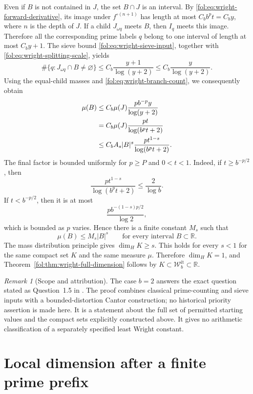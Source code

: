 \documentclass[11pt,a4paper]{article}
\theoremstyle{definition}
\theoremstyle{remark}
\newtheorem{remark}[theorem]{Remark}
\numberwithin{equation}{section}
\begin{document}
Even if $B$ is not contained in $J$, the set $B\cap J$ is an interval. By \eqref{fol:eq:wright-forward-derivative}, its image under
$f^{\circ(n+1)}$ has length at most $C_b b^pt=C_b y$, where $n$ is
the depth of $J$. If a child $J_{\omega q}$ meets $B$, then $I_q$ meets this image. Therefore all the corresponding prime labels $q$
belong to one interval of length at most $C_b y+1$. The sieve bound
\eqref{fol:eq:wright-sieve-input}, together with
\eqref{fol:eq:wright-splitting-scale}, yields
\[
 \#\{q:J_{\omega q}\cap B\ne\varnothing\}
 \le C_b\frac{y+1}{\log(y+2)}
 \le C_b\frac{y}{\log(y+2)}.
\]
Using the equal-child masses and
\eqref{fol:eq:wright-branch-count}, we consequently obtain
\begin{align}
 \mu(B)
 &\le C_b\mu(J)\frac{p b^{-p}y}{\log(y+2)}\notag\\
 &=C_b\mu(J)\frac{pt}{\log(b^pt+2)}\notag\\
 &\le C_b A_s |B|^s
       \frac{p t^{1-s}}{\log(b^pt+2)}.
 \label{fol:eq:wright-general-interval}
\end{align}
The final factor is bounded uniformly for $p\ge P$ and $0<t<1$. Indeed, if $t\ge b^{-p/2}$, then
\[
 \frac{p t^{1-s}}{\log(b^pt+2)}\le\frac2{\log b}.
\]
If $t<b^{-p/2}$, then it is at most
\[
 \frac{p b^{-(1-s)p/2}}{\log2},
\]
which is bounded as $p$ varies. Hence there is a finite constant $M_s$ such that
\[
 \mu(B)\le M_s|B|^s
 \qquad\text{for every interval }B\subset\mathbb R.
\]
The mass distribution principle gives $\dim_HK\ge s$. This holds for every $s<1$ for the same compact set $K$ and the same measure $\mu$.
Therefore $\dim_HK=1$, and Theorem~\ref{fol:thm:wright-full-dimension} follows by $K\subset\mathcal W_b^{\mathrm{it}}\subset\mathbb R$.
\begin{remark}[Scope and attribution]
The case $b=2$ answers the exact question stated as Question~1.5 in
\cite[arXiv version]{SaitoDimension2021}. The proof combines classical
prime-counting and sieve inputs with a bounded-distortion Cantor construction; no historical priority assertion is made here. It is a
statement about the full set of permitted starting values and the compact sets explicitly constructed above. It gives no arithmetic
classification of a separately specified least Wright constant.
\end{remark}


\section{Local dimension after a finite prime prefix}
\label{fol:sec:local-dimension}
\end{document}
